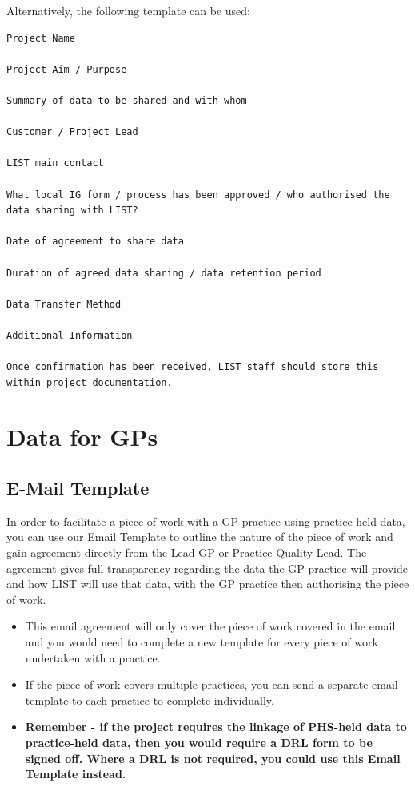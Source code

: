 \documentclass[
]{book}
\begin{document}
Alternatively, the following template can be used:

\begin{verbatim}
Project Name 

Project Aim / Purpose 

Summary of data to be shared and with whom 

Customer / Project Lead 

LIST main contact 

What local IG form / process has been approved / who authorised the data sharing with LIST? 

Date of agreement to share data 

Duration of agreed data sharing / data retention period 

Data Transfer Method

Additional Information

Once confirmation has been received, LIST staff should store this within project documentation. 
\end{verbatim}

\hypertarget{data-for-gps}{%
\chapter{Data for GPs}\label{data-for-gps}}

\hypertarget{e-mail-template}{%
\section{E-Mail Template}\label{e-mail-template}}

In order to facilitate a piece of work with a GP practice using practice-held data, you can use our Email Template to outline the nature of the piece of work and gain agreement directly from the Lead GP or Practice Quality Lead. The agreement gives full transparency regarding the data the GP practice will provide and how LIST will use that data, with the GP practice then authorising the piece of work.

\begin{itemize}
\item
  This email agreement will only cover the piece of work covered in the email and you would need to complete a new template for every piece of work undertaken with a practice.
\item
  If the piece of work covers multiple practices, you can send a separate email template to each practice to complete individually.
\item
  \textbf{Remember - if the project requires the linkage of PHS-held data to practice-held data, then you would require a DRL form to be signed off. Where a DRL is not required, you could use this Email Template instead.}
\end{itemize}
\end{document}
